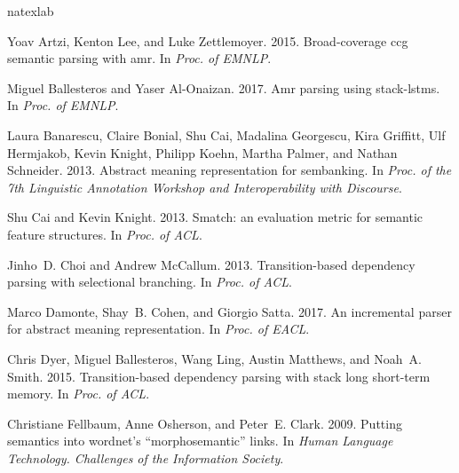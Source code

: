 \documentclass[11pt,a4paper]{article}
\begin{document}
%

\begin{thebibliography}{30}
	\expandafter\ifx\csname natexlab\endcsname\relax\def\natexlab#1{#1}\fi
	
	Yoav Artzi, Kenton Lee, and Luke Zettlemoyer. 2015.
	\newblock Broad-coverage ccg semantic parsing with amr.
	\newblock In \emph{Proc. of EMNLP}.
	
	Miguel Ballesteros and Yaser Al-Onaizan. 2017.
	\newblock Amr parsing using stack-lstms.
	\newblock In \emph{Proc. of EMNLP}.
	
	Laura Banarescu, Claire Bonial, Shu Cai, Madalina Georgescu, Kira Griffitt, Ulf
	Hermjakob, Kevin Knight, Philipp Koehn, Martha Palmer, and Nathan Schneider.
	2013.
	\newblock Abstract meaning representation for sembanking.
	\newblock In \emph{Proc. of the 7th Linguistic Annotation Workshop and
		Interoperability with Discourse}.
	
	Shu Cai and Kevin Knight. 2013.
	\newblock Smatch: an evaluation metric for semantic feature structures.
	\newblock In \emph{Proc. of ACL}.
	
	Jinho~D. Choi and Andrew McCallum. 2013.
	\newblock Transition-based dependency parsing with selectional branching.
	\newblock In \emph{Proc. of ACL}.
	
	Marco Damonte, Shay~B. Cohen, and Giorgio Satta. 2017.
	\newblock An incremental parser for abstract meaning representation.
	\newblock In \emph{Proc. of EACL}.
	
	Chris Dyer, Miguel Ballesteros, Wang Ling, Austin Matthews, and Noah~A. Smith.
	2015.
	\newblock Transition-based dependency parsing with stack long short-term
	memory.
	\newblock In \emph{Proc. of ACL}.
	
	Christiane Fellbaum, Anne Osherson, and Peter~E. Clark. 2009.
	\newblock Putting semantics into wordnet's ``morphosemantic'' links.
	\newblock In \emph{Human Language Technology. Challenges of the Information
		Society}.
	

\end{thebibliography}
\end{document}
